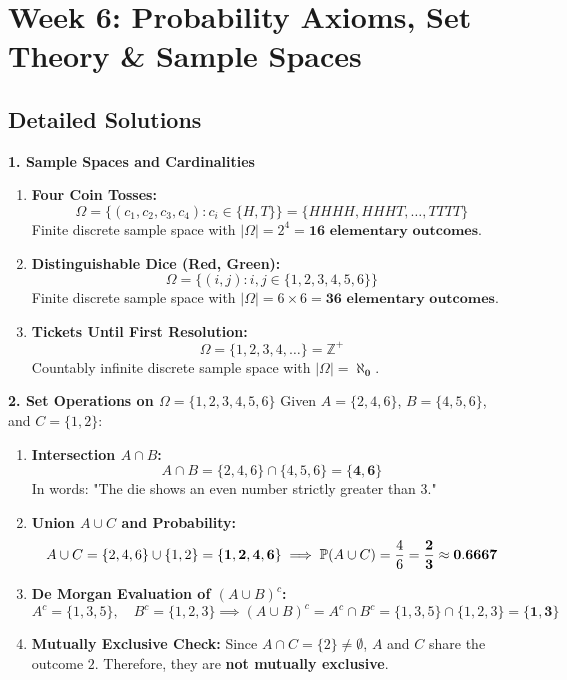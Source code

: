 \section*{Week 6: Probability Axioms, Set Theory \& Sample Spaces}

\subsection*{Detailed Solutions}

\textbf{1. Sample Spaces and Cardinalities}
\begin{enumerate}
    \item \textbf{Four Coin Tosses:}
    $$\Omega = \{(c_1, c_2, c_3, c_4) \colon c_i \in \{H, T\}\} = \{HHHH, HHHT, \dots, TTTT\}$$
    Finite discrete sample space with $|\Omega| = 2^4 = \mathbf{16 \text{ elementary outcomes}}$.
    \item \textbf{Distinguishable Dice (Red, Green):}
    $$\Omega = \{(i, j) \colon i, j \in \{1, 2, 3, 4, 5, 6\}\}$$
    Finite discrete sample space with $|\Omega| = 6 \times 6 = \mathbf{36 \text{ elementary outcomes}}$.
    \item \textbf{Tickets Until First Resolution:}
    $$\Omega = \{1, 2, 3, 4, \dots\} = \mathbb{Z}^+$$
    Countably infinite discrete sample space with $|\Omega| = \mathbf{\aleph_0}$.
\end{enumerate}

\textbf{2. Set Operations on $\Omega = \{1, 2, 3, 4, 5, 6\}$}
Given $A = \{2, 4, 6\}$, $B = \{4, 5, 6\}$, and $C = \{1, 2\}$:
\begin{enumerate}
    \item \textbf{Intersection $A \cap B$:}
    $$A \cap B = \{2, 4, 6\} \cap \{4, 5, 6\} = \mathbf{\{4, 6\}}$$
    In words: "The die shows an even number strictly greater than 3."
    \item \textbf{Union $A \cup C$ and Probability:}
    $$A \cup C = \{2, 4, 6\} \cup \{1, 2\} = \mathbf{\{1, 2, 4, 6\}} \implies \P(A \cup C) = \frac{4}{6} = \mathbf{\frac{2}{3} \approx 0.6667}$$
    \item \textbf{De Morgan Evaluation of $(A \cup B)^c$:}
    $$A^c = \{1, 3, 5\}, \quad B^c = \{1, 2, 3\} \implies (A \cup B)^c = A^c \cap B^c = \{1, 3, 5\} \cap \{1, 2, 3\} = \mathbf{\{1, 3\}}$$
    \item \textbf{Mutually Exclusive Check:} Since $A \cap C = \{2\} \neq \emptyset$, $A$ and $C$ share the outcome $2$. Therefore, they are \textbf{not mutually exclusive}.
\end{enumerate}

